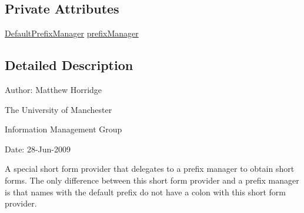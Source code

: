 \subsection*{Private Attributes}
\begin{DoxyCompactItemize}
\item 
\hyperlink{classorg_1_1semanticweb_1_1owlapi_1_1util_1_1_default_prefix_manager}{Default\-Prefix\-Manager} \hyperlink{classuk_1_1ac_1_1manchester_1_1cs_1_1owl_1_1owlapi_1_1mansyntaxrenderer_1_1_manchester_o_w_l_syn9b805e7397984f62b2f3f095697b987e_ad36de2fc14a17de20a948af6c6c5cef6}{prefix\-Manager}
\end{DoxyCompactItemize}


\subsection{Detailed Description}
Author\-: Matthew Horridge\par
 The University of Manchester\par
 Information Management Group\par
 Date\-: 28-\/\-Jun-\/2009

A special short form provider that delegates to a prefix manager to obtain short forms. The only difference between this short form provider and a prefix manager is that names with the default prefix do not have a colon with this short form provider. 

